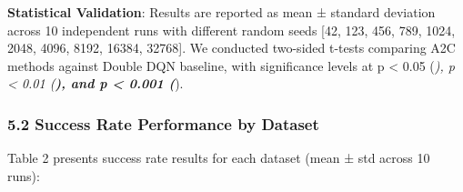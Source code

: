 \documentclass[
  10pt,
  twocolumn,
]{article}
\begin{document}
\textbf{Statistical Validation}: Results are reported as mean ± standard
deviation across 10 independent runs with different random seeds {[}42,
123, 456, 789, 1024, 2048, 4096, 8192, 16384, 32768{]}. We conducted
two-sided t-tests comparing A2C methods against Double DQN baseline,
with significance levels at p \textless{} 0.05 (\emph{), p \textless{}
	0.01 (\textbf{), and p \textless{} 0.001 (}}).

\hypertarget{success-rate-performance-by-dataset}{%
	\subsubsection{5.2 Success Rate Performance by
		Dataset}\label{success-rate-performance-by-dataset}}

Table 2 presents success rate results for each dataset (mean ± std
across 10 runs):
\end{document}
